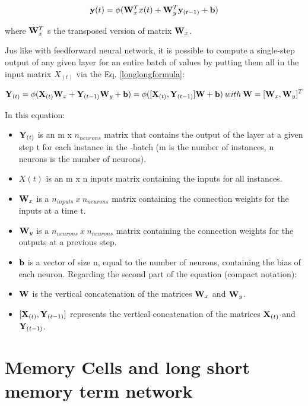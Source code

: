 \begin{equation} 
   {\bf y }(t) = {\bf \phi}({\bf W}_{x}^{T} x (t) +{\bf W} _{y} ^{T} {\bf y} _{(t-1)} + {\bf b}) 
    \label{longformula}
\end{equation}

where ${\bf W}_x^T$  s the transposed version of matrix ${\bf W}_x$.

Jus like with feedforward neural network, it is possible to compute a single-step output of any given layer for  an entire batch of values by putting them all in the input matrix $X_{(t)}$ via the Eq. \eqref{longlongformula}:

\begin{equation} 
   {\bf Y} _{(t)} = {\bf \phi}({\bf X}_{(t)} {\bf W} _x + {\bf Y} _{(t-1)}{\bf W}_y + {\bf b}) = {\bf \phi}([{\bf X }_{(t)} , {\bf Y}_{(t-1)} ] {\bf W}  + {\bf b}) \: with \: {\bf W} = [{\bf W}_x ,{\bf W}_y ]^T
    \label{longlongformula}
\end{equation}

In this equation: 

\begin{itemize}
    \item ${\bf Y}_{(t)}$ is an m x $n_{neurons}$ matrix that contains the output of the layer at a given step t for each instance in the -batch (m is the number of instances, n neurons is the number of neurons).
    \item $X (t)$ is an m x n inputs matrix containing the inputs for all instances.
    \item ${\bf W}_x$ is a  $n_{inputs} \:x\: n_{neurons}$ matrix containing the connection weights for the inputs at a time t.
    \item ${\bf W}_y $ is a $n_{neurons} \:x\: n_ {neurons}$ matrix  containing the connection weights for the outputs at a previous step.
    \item ${\bf b}$ is a vector of size n, equal to the number of neurons, containing the bias of each neuron.
    Regarding the second part of the equation (compact notation):
     \item ${\bf W}$ is the vertical concatenation of the matrices ${\bf W}_x$ and ${\bf W}_y$.
    \item $[{\bf X}_{(t)}, {\bf Y}_{(t-1)}]$ represents the vertical concatenation of the matrices ${\bf X}_{(t)}$ and ${\bf Y}_{(t-1)}$.
\end{itemize}

\section{Memory Cells and long short memory term network}

